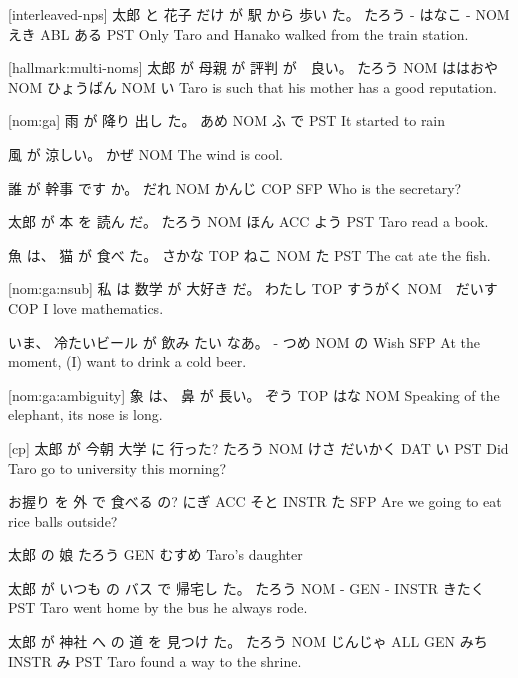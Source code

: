[interleaved-nps]
太郎  と 花子  だけ が  駅  から 歩い  た。
たろう - はなこ -  NOM えき ABL ある  PST
Only Taro and Hanako walked from the train station.

[hallmark:multi-noms]
太郎  が   母親    が   評判      が　良い。
たろう NOM ははおや NOM ひょうばん NOM い
Taro is such that his mother has a good reputation.

[nom:ga]
雨  が   降り 出し た。
あめ NOM ふ   で PST
It started to rain

風  が   涼しい。
かぜ NOM
The wind is cool.

誰  が   幹事   です か。
だれ NOM かんじ  COP SFP
Who is the secretary?

太郎   が  本  を   読ん だ。
たろう NOM ほん ACC よう PST
Taro read a book.

魚    は、 猫   が  食べ た。
さかな TOP ねこ NOM た  PST
The cat ate the fish.

[nom:ga:nsub]
私    は   数学    が   大好き だ。
わたし TOP すうがく NOM　だいす COP
I love mathematics.

いま、 冷たいビール が  飲み たい なあ。
-    つめ        NOM の  Wish SFP
At the moment, (I) want to drink a cold beer.

[nom:ga:ambiguity]
象   は、 鼻  が 長い。
ぞう TOP はな NOM
Speaking of the elephant, its nose is long.

[cp]
太郎   が  今朝 大学    に   行った?
たろう NOM けさ だいかく DAT い PST
Did Taro go to university this morning?

お握り を   外  で      食べる の?
にぎ   ACC そと INSTR  た SFP
Are we going to eat rice balls outside?

太郎   の   娘
たろう GEN むすめ
Taro's daughter

太郎   が いつも の  バス で    帰宅し た。
たろう NOM -    GEN -   INSTR きたく PST
Taro went home by the bus he always rode.

太郎   が  神社    へ   の  道   を    見つけ た。
たろう NOM じんじゃ ALL GEN みち INSTR み    PST
Taro found a way to the shrine.

